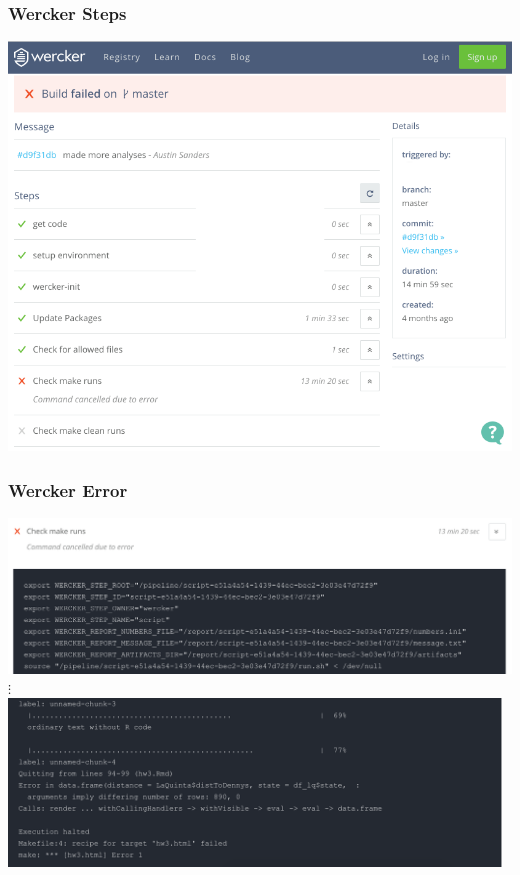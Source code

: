 \documentclass[12pt]{beamer}
\begin{document}
\begin{frame}
\frametitle{Wercker Steps}

\includegraphics[width=\textwidth]{imgs/wercker_fail.png}

\end{frame}


\begin{frame}
\frametitle{Wercker Error}
\begin{center}
\includegraphics[width=\textwidth]{imgs/wercker_error1.png} \\
$\vdots$ \\
\vspace{1mm}
\includegraphics[width=0.98\textwidth]{imgs/wercker_error2.png}
\end{center}
\end{frame}
\end{document}
